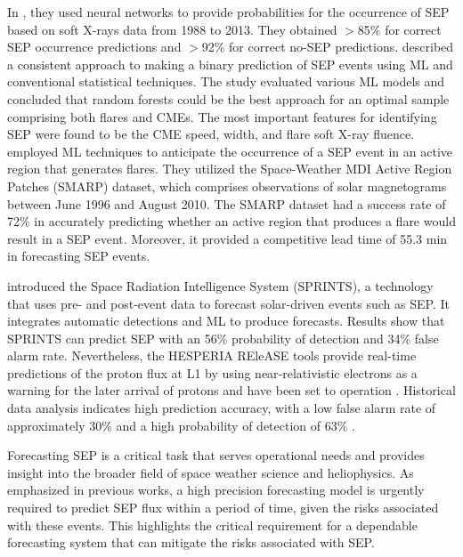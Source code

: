 In \citet{aminalragia_2021}, they used neural networks to provide probabilities for the occurrence of SEP based on soft X-rays data from 1988 to 2013. They obtained $>$85\% for correct SEP occurrence predictions and $>$92\% for correct no-SEP predictions.
\citet{lavasa_2021} described a consistent approach to making a binary prediction of SEP events using ML and conventional statistical techniques. The study evaluated various ML models and concluded that random forests could be the best approach for an optimal sample comprising both flares and CMEs. The most important features for identifying SEP were found to be the CME speed, width, and flare soft X-ray fluence.
\citet{kasapis_2022} employed ML techniques to anticipate the occurrence of a SEP event in an active region that generates flares. They utilized the Space-Weather MDI Active Region Patches (SMARP) dataset, which comprises observations of solar magnetograms between June 1996 and August 2010. The SMARP dataset had a success rate of 72\% in accurately predicting whether an active region that produces a flare would result in a SEP event. Moreover, it provided a competitive lead time of 55.3 min in forecasting SEP events.

\citet{engell_2017} introduced the Space Radiation Intelligence System (SPRINTS), a technology that uses pre- and post-event data to forecast solar-driven events such as SEP. It integrates automatic detections and ML to produce forecasts. Results show that SPRINTS can predict SEP with an 56\% probability of detection and 34\% false alarm rate.
Nevertheless, the HESPERIA REleASE tools provide real-time predictions of the proton flux at L1 by using near-relativistic electrons as a warning for the later arrival of protons and have been set to operation \citep{malandraki_2018}. Historical data analysis indicates high prediction accuracy, with a low false alarm rate of approximately 30\% and a high probability of detection of 63\% \citep{malandraki_2018}.

Forecasting SEP is a critical task that serves operational needs and provides insight into the broader field of space weather science and heliophysics. As emphasized in previous works, a high precision forecasting model is urgently required to predict SEP flux within a period of time, given the risks associated with these events. This highlights the critical requirement for a dependable forecasting system that can mitigate the risks associated with SEP.

